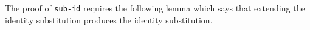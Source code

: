 \begin{fence}
\begin{code}
\AgdaSpace{}%
\AgdaSymbol{(}\AgdaSpace{}%
\AgdaSymbol{)}\<%
\\
%
\>[3]\<%
\\
\>[3][@{}l@{\AgdaIndent{0}}]%
\>[5]\AgdaSpace{}%
\AgdaSpace{}%
\AgdaSpace{}%
\AgdaSpace{}%
\AgdaSpace{}%
\<%
\\
%
\>[3]\AgdaSpace{}%
\AgdaSpace{}%
\AgdaSpace{}%
\AgdaSymbol{(}\AgdaSymbol{\{}\AgdaSpace{}%
\AgdaSymbol{=}\AgdaSpace{}%
\AgdaSymbol{\}}\AgdaSpace{}%
\AgdaSpace{}%
\AgdaSymbol{)}\AgdaSpace{}%
\<%
\\
\>[3][@{}l@{\AgdaIndent{0}}]%
\>[5]\AgdaSpace{}%
\AgdaSpace{}%
\AgdaSymbol{(}\AgdaSpace{}%
\AgdaSymbol{)}\AgdaSpace{}%
\AgdaSpace{}%
\AgdaSymbol{(}\AgdaSpace{}%
\AgdaSpace{}%
\AgdaSymbol{)}\AgdaSpace{}%
\AgdaSpace{}%
\<%
\\
%
\>[3]\<%
\end{code}
\end{fence}

The proof of \texttt{sub-id} requires the following lemma which says
that extending the identity substitution produces the identity
substitution.

